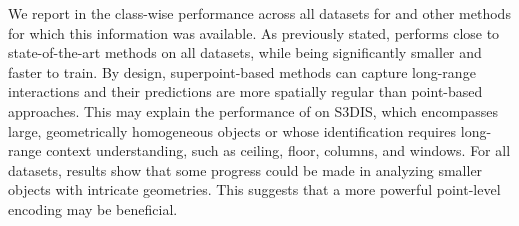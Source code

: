 We report in  the class-wise performance across all datasets for \SHORTHAND and other methods for which this information was available. As previously stated, \SHORTHAND performs close to state-of-the-art methods on all datasets, while being significantly smaller and faster to train. 
By design, superpoint-based methods can capture long-range interactions and their predictions are more spatially regular than point-based approaches. This may explain the performance of \SHORTHAND on S3DIS, which encompasses large, geometrically homogeneous objects or whose identification requires long-range context understanding, such as ceiling, floor, columns, and windows.
For all datasets, results show that some progress could be made in analyzing smaller objects with intricate geometries. This suggests that a more powerful point-level encoding may be beneficial.

\balance

